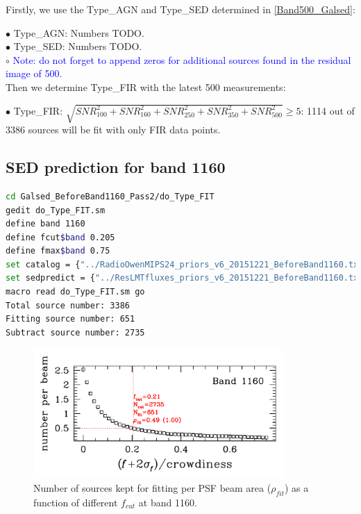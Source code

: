 \documentclass[11pt,a4paper]{article}
\begin{document}
Firstly, we use the Type\_AGN and Type\_SED determined in \ref{Band500_Galsed}:

\indent\hspace{15pt}$\bullet$ 
Type\_AGN: Numbers TODO. 
\\
\indent\hspace{15pt}$\bullet$ 
Type\_SED: Numbers TODO. 
\\
\indent\hspace{15pt}$\circ$ 
\textcolor{blue}{Note: \textcolor{blue}{do not forget} to append zeros for additional sources found in the residual image of 500.}
\\

Then we determine Type\_FIR with the latest 500 measurements:

\indent\hspace{15pt}$\bullet$ 
Type\_FIR: $\sqrt{SNR_{100}^2+SNR_{160}^2+SNR_{250}^2+SNR_{350}^2+SNR_{500}^2} \ge 5$: 1114 out of 3386 sources will be fit with only FIR data points. 
\\

\subsection{SED prediction for band 1160}
\label{Band1160_Galpre}

\begin{lstlisting}[language=bash]
cd Galsed_BeforeBand1160_Pass2/do_Type_FIT
gedit do_Type_FIT.sm
define band 1160
define fcut$band 0.205
define fmax$band 0.75
set catalog = {"../RadioOwenMIPS24_priors_v6_20151221_BeforeBand1160.txt"}
set sedpredict = {"../ResLMTfluxes_priors_v6_20151221_BeforeBand1160.txt"}
macro read do_Type_FIT.sm go
Total source number: 3386
Fitting source number: 651
Subtract source number: 2735
\end{lstlisting}

\begin{figure}[H]
	\caption{Number of sources kept for fitting per PSF beam area ($\rho_{fit}$) as a function of different $f_{cut}$ at band 1160.}
	\includegraphics[width=0.85\textwidth]{plot_cutting_flux_1160_with_crow}
\end{figure}
\end{document}
